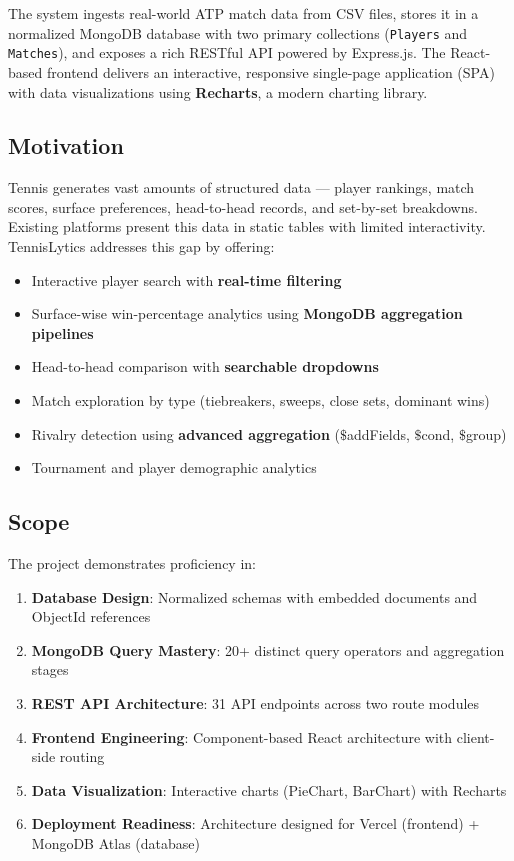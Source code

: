 \documentclass[12pt,a4paper]{article}
\begin{document}
The system ingests real-world ATP match data from CSV files, stores it in a normalized MongoDB database with two primary collections (\texttt{Players} and \texttt{Matches}), and exposes a rich RESTful API powered by Express.js. The React-based frontend delivers an interactive, responsive single-page application (SPA) with data visualizations using \textbf{Recharts}, a modern charting library.

\subsection{Motivation}
Tennis generates vast amounts of structured data --- player rankings, match scores, surface preferences, head-to-head records, and set-by-set breakdowns. Existing platforms present this data in static tables with limited interactivity. TennisLytics addresses this gap by offering:

\begin{itemize}[noitemsep]
    \item Interactive player search with \textbf{real-time filtering}
    \item Surface-wise win-percentage analytics using \textbf{MongoDB aggregation pipelines}
    \item Head-to-head comparison with \textbf{searchable dropdowns}
    \item Match exploration by type (tiebreakers, sweeps, close sets, dominant wins)
    \item Rivalry detection using \textbf{advanced aggregation} ($\$$addFields, $\$$cond, $\$$group)
    \item Tournament and player demographic analytics
\end{itemize}

\subsection{Scope}
The project demonstrates proficiency in:
\begin{enumerate}[noitemsep]
    \item \textbf{Database Design}: Normalized schemas with embedded documents and ObjectId references
    \item \textbf{MongoDB Query Mastery}: 20+ distinct query operators and aggregation stages
    \item \textbf{REST API Architecture}: 31 API endpoints across two route modules
    \item \textbf{Frontend Engineering}: Component-based React architecture with client-side routing
    \item \textbf{Data Visualization}: Interactive charts (PieChart, BarChart) with Recharts
    \item \textbf{Deployment Readiness}: Architecture designed for Vercel (frontend) + MongoDB Atlas (database)
\end{enumerate}
\end{document}
